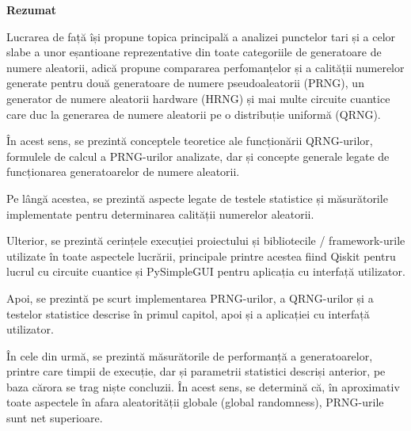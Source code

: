 \newpage
\begin{center}
    \LARGE
    \textbf{\thesistitle}
    
    \vspace{0.5cm}
    
    \authornamefl
    
    \vspace{1cm}
    
    \textbf{Rezumat}
    
    \vspace{1cm}
\end{center}


Lucrarea de față își propune topica principală a analizei punctelor tari și a celor slabe a unor eșantioane reprezentative din toate categoriile de generatoare de numere aleatorii, adică propune compararea perfomanțelor și a calității numerelor generate pentru două generatoare de numere pseudoaleatorii (PRNG), un generator de numere aleatorii hardware (HRNG) și mai multe circuite cuantice care duc la generarea de numere aleatorii pe o distribuție uniformă (QRNG).

În acest sens, se prezintă conceptele teoretice ale funcționării QRNG-urilor, formulele de calcul a PRNG-urilor analizate, dar și concepte generale legate de funcționarea generatoarelor de numere aleatorii.

Pe lângă acestea, se prezintă aspecte legate de testele statistice și măsurătorile implementate pentru determinarea calității numerelor aleatorii.

Ulterior, se prezintă cerințele execuției proiectului și bibliotecile / framework-urile utilizate în toate aspectele lucrării, principale printre acestea fiind Qiskit pentru lucrul cu circuite cuantice și PySimpleGUI pentru aplicația cu interfață utilizator.

Apoi, se prezintă pe scurt implementarea PRNG-urilor, a QRNG-urilor și a testelor statistice descrise în primul capitol, apoi și a aplicației cu interfață utilizator. 

În cele din urmă, se prezintă măsurătorile de performanță a generatoarelor, printre care timpii de execuție, dar și parametrii statistici descriși anterior, pe baza cărora se trag niște concluzii. În acest sens, se determină că, în aproximativ toate aspectele în afara aleatorității globale (global randomness), PRNG-urile sunt net superioare.